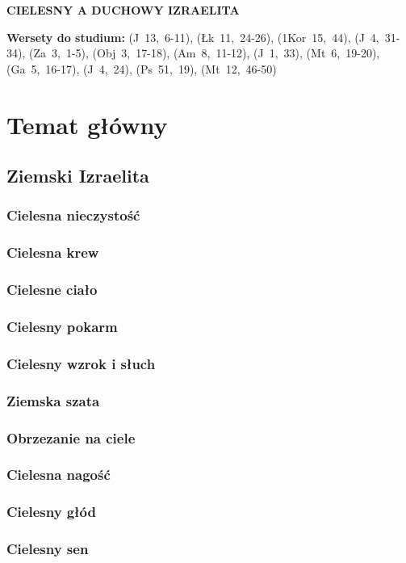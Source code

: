 \documentclass[10pt,a4paper,oneside]{article}
\begin{document}
\centerline{\textbf{\MakeUppercase{Cielesny a duchowy Izraelita}}}
\begin{center}
\textbf{Wersety do studium:} \mbox{(J 13, 6-11)}, \mbox{(Łk 11, 24-26)}, \mbox{(1Kor 15, 44)}, \mbox{(J 4, 31-34)}, \mbox{(Za 3, 1-5)}, \mbox{(Obj 3, 17-18)}, \mbox{(Am 8, 11-12)}, \mbox{(J 1, 33)}, \mbox{(Mt 6, 19-20)}, \mbox{(Ga 5, 16-17)}, \mbox{(J 4, 24)}, \mbox{(Ps 51, 19)}, \mbox{(Mt 12, 46-50)}
\end{center}
\section{Temat główny}
\subsection{Ziemski Izraelita}
\subsubsection{Cielesna nieczystość}
\subsubsection{Cielesna krew}
\subsubsection{Cielesne ciało}
\subsubsection{Cielesny pokarm}
\subsubsection{Cielesny wzrok i słuch}
\subsubsection{Ziemska szata}
\subsubsection{Obrzezanie na ciele}
\subsubsection{Cielesna nagość}
\subsubsection{Cielesny głód}
\subsubsection{Cielesny sen}
\end{document}
